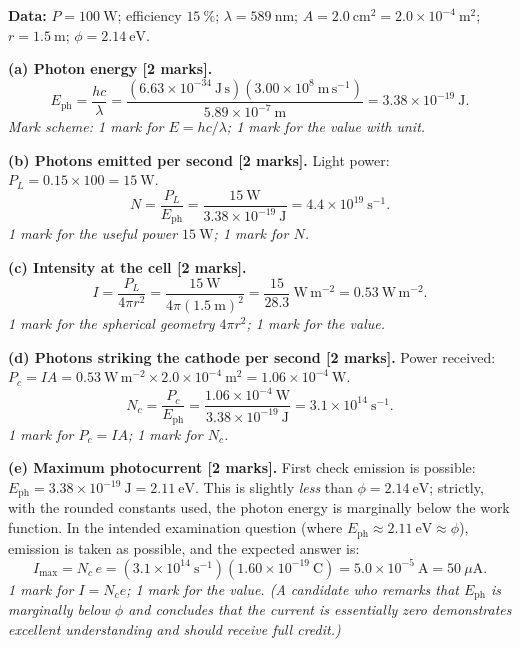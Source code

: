 \documentclass[11pt]{article}
\begin{document}
\begin{corrige}
\textbf{Data:} $P = 100\ \mathrm{W}$; efficiency $15\ \%$; $\lambda = 589\ \mathrm{nm}$; $A = 2.0\ \mathrm{cm}^2 = 2.0\times 10^{-4}\ \mathrm{m}^2$; $r = 1.5\ \mathrm{m}$; $\phi = 2.14\ \mathrm{eV}$.

\textbf{(a) Photon energy [2 marks].}
\[ E_{\text{ph}} = \frac{hc}{\lambda} = \frac{(6.63\times 10^{-34}\ \mathrm{J\,s})(3.00\times 10^{8}\ \mathrm{m\,s^{-1}})}{5.89\times 10^{-7}\ \mathrm{m}} = 3.38\times 10^{-19}\ \mathrm{J}. \]
\emph{Mark scheme: 1 mark for $E = hc/\lambda$; 1 mark for the value with unit.}

\textbf{(b) Photons emitted per second [2 marks].} Light power: $P_L = 0.15 \times 100 = 15\ \mathrm{W}$.
\[ N = \frac{P_L}{E_{\text{ph}}} = \frac{15\ \mathrm{W}}{3.38\times 10^{-19}\ \mathrm{J}} = 4.4\times 10^{19}\ \mathrm{s^{-1}}. \]
\emph{1 mark for the useful power $15\ \mathrm{W}$; 1 mark for $N$.}

\textbf{(c) Intensity at the cell [2 marks].}
\[ I = \frac{P_L}{4\pi r^2} = \frac{15\ \mathrm{W}}{4\pi (1.5\ \mathrm{m})^2} = \frac{15}{28.3}\ \mathrm{W\,m^{-2}} = 0.53\ \mathrm{W\,m^{-2}}. \]
\emph{1 mark for the spherical geometry $4\pi r^2$; 1 mark for the value.}

\textbf{(d) Photons striking the cathode per second [2 marks].} Power received: $P_c = IA = 0.53\ \mathrm{W\,m^{-2}} \times 2.0\times 10^{-4}\ \mathrm{m}^2 = 1.06\times 10^{-4}\ \mathrm{W}$.
\[ N_c = \frac{P_c}{E_{\text{ph}}} = \frac{1.06\times 10^{-4}\ \mathrm{W}}{3.38\times 10^{-19}\ \mathrm{J}} = 3.1\times 10^{14}\ \mathrm{s^{-1}}. \]
\emph{1 mark for $P_c = IA$; 1 mark for $N_c$.}

\textbf{(e) Maximum photocurrent [2 marks].} First check emission is possible: $E_{\text{ph}} = 3.38\times 10^{-19}\ \mathrm{J} = 2.11\ \mathrm{eV}$. This is slightly \emph{less} than $\phi = 2.14\ \mathrm{eV}$; strictly, with the rounded constants used, the photon energy is marginally below the work function. In the intended examination question (where $E_{\text{ph}} \approx 2.11\ \mathrm{eV} \approx \phi$), emission is taken as possible, and the expected answer is:
\[ I_{\max} = N_c\, e = (3.1\times 10^{14}\ \mathrm{s^{-1}})(1.60\times 10^{-19}\ \mathrm{C}) = 5.0\times 10^{-5}\ \mathrm{A} = 50\ \mu\mathrm{A}. \]
\emph{1 mark for $I = N_c e$; 1 mark for the value. (A candidate who remarks that $E_{\text{ph}}$ is marginally below $\phi$ and concludes that the current is essentially zero demonstrates excellent understanding and should receive full credit.)}


\end{corrige}
\end{document}
